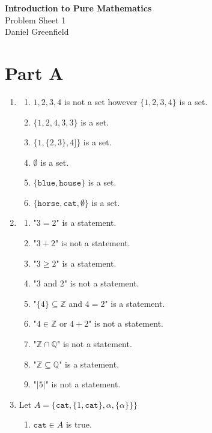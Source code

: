 \documentclass[11pt,a4paper]{article}
\newcommand{\modulename}{Introduction to Pure Mathematics}
\newcommand{\sheetnumber}{1}
\newcommand{\myname}{Daniel Greenfield}
\newcommand{\Z}{\mathbb{Z}}
\newcommand{\Q}{\mathbb{Q}}
\begin{document}
\begin{center}
  {\Large \textbf{\modulename}}\\[0.3em]
  {\large Problem Sheet \sheetnumber}\\[0.3em]
  \myname
\end{center}

\section*{Part A}
\begin{enumerate}
    \item \begin{enumerate}
            \item $1,2,3,4$ is not a set however $\{1,2,3,4\}$ is a set. 
            \item $\{1,2,4,3,3\}$ is a set.
            \item $\{1, \{ 2, 3\}, 4]\}$ is a set.
            \item $\emptyset$ is a set.
            \item $\{\texttt{blue}, \texttt{house}\}$ is a set.
            \item $\{\texttt{horse}, \texttt{cat}, \emptyset\}$ is a set.
    \end{enumerate} 
    \item \begin{enumerate}
            \item  "$3 = 2$" is a statement.
            \item  "$3 + 2$" is not a statement.
            \item  "$3 \geq 2$" is a statement.
            \item  "$3$ and $ 2$" is not a statement.
            \item  "$\{4\} \subseteq \Z$ and $ 4 = 2$" is a statement.
            \item  "$4 \in \Z$ or $ 4 + 2$" is not a statement.
            \item  "$\Z \cap \Q$" is not a statement.
            \item  "$\Z \subseteq \Q$" is a statement.
            \item  "$|5|$" is not a statement.
    \end{enumerate}
    \item Let $A = \{ \texttt{cat} , \{1, \texttt{cat}\}, \alpha, \{\alpha\}\}\}$
        \begin{enumerate}
            \item $\texttt{cat} \in A$ is true.

\end{enumerate}
\end{enumerate}
\end{document}
